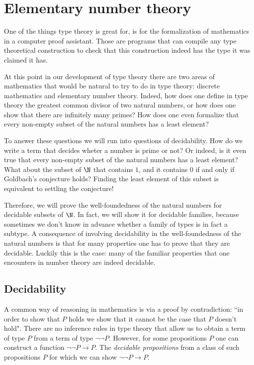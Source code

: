 \section{Elementary number theory}

One of the things type theory is great for, is for the formalization of mathematics in a computer proof assistant. Those are programs that can compile any type theoretical construction to check that this construction indeed has the type it was claimed it has.

At this point in our development of type theory there are two areas of mathematics that would be natural to try to do in type theory: discrete mathematics and elementary number theory. Indeed, how does one define in type theory the greatest common divisor of two natural numbers, or how does one show that there are infinitely many primes? How does one even formalize that every non-empty subset of the natural numbers has a least element?

To answer these questions we will run into questions of decidability. How do we write a term that decides wheter a number is prime or not? Or indeed, is it even true that every non-empty subset of the natural numbers has a least element? What about the subset of $\N$ that contains $1$, and it contains $0$ if and only if Goldbach's conjecture holds? Finding the least element of this subset is equivalent to settling the conjecture!

Therefore, we will prove the well-foundedness of the natural numbers for decidable subsets of $\N$. In fact, we will show it for decidable families, because sometimes we don't know in advance whether a family of types is in fact a subtype. A consequence of involving decidability in the well-foundedness of the natural numbers is that for many properties one has to prove that they are decidable. Luckily this is the case: many of the familiar properties that one encounters in number theory are indeed decidable.

\subsection{Decidability}

A common way of reasoning in mathematics is via a proof by contradiction: ``in order to show that $P$ holds we show that it cannot be the case that $P$ doesn't hold". There are no inference rules in type theory that allow us to obtain a term of type $P$ from a term of type $\neg\neg P$. However, for some propositions $P$ one can construct a function $\neg\neg P \to P$. The \emph{decidable propositions} from a class of such propositions $P$ for which we can show $\neg\neg P \to P$.

